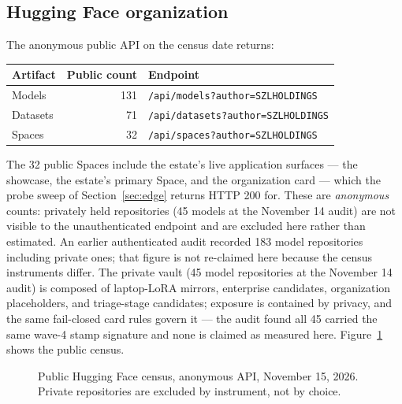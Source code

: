 ﻿\documentclass[11pt]{article}
\begin{document}
\subsection{Hugging Face organization}
The anonymous public API on the census date returns:
\begin{center}
\begin{tabular}{lrl}
\toprule
\textbf{Artifact} & \textbf{Public count} & \textbf{Endpoint} \\
\midrule
Models & 131 & \texttt{/api/models?author=SZLHOLDINGS} \\
Datasets & 71 & \texttt{/api/datasets?author=SZLHOLDINGS} \\
Spaces & 32 & \texttt{/api/spaces?author=SZLHOLDINGS} \\
\bottomrule
\end{tabular}
\end{center}
The 32 public Spaces include the estate's live application surfaces --- the showcase, the estate's primary Space, and the organization card --- which the probe sweep of Section~\ref{sec:edge} returns HTTP 200 for. These are \emph{anonymous} counts: privately held repositories (45 models at the November 14 audit) are not visible to the unauthenticated endpoint and are excluded here rather than estimated. An earlier authenticated audit recorded 183 model repositories including private ones; that figure is not re-claimed here because the census instruments differ. The private vault (45 model repositories at the November 14 audit) is composed of laptop-LoRA mirrors, enterprise candidates, organization placeholders, and triage-stage candidates; exposure is contained by privacy, and the same fail-closed card rules govern it --- the audit found all 45 carried the same wave-4 stamp signature and none is claimed as measured here. Figure~\ref{fig:census} shows the public census.

\begin{figure}[htbp]
\centering
{}
\caption{Public Hugging Face census, anonymous API, November 15, 2026. Private repositories are excluded by instrument, not by choice.}
\label{fig:census}
\end{figure}
\end{document}
